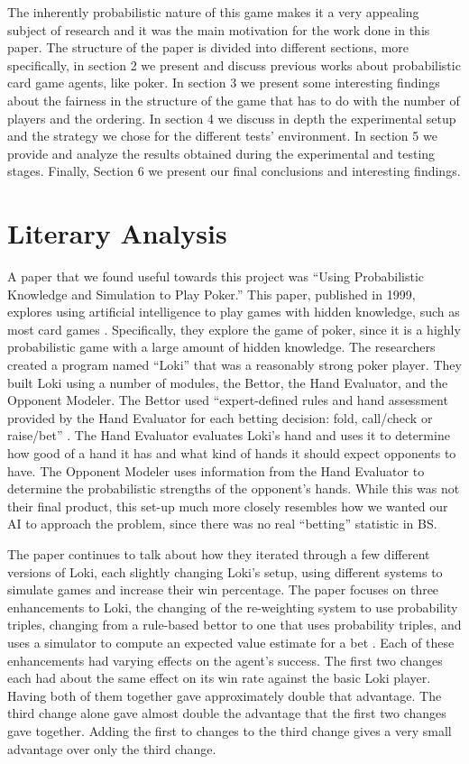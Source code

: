 \documentclass[a4paper,11pt]{article}
\begin{document}
The inherently probabilistic nature of this game makes it a very appealing subject of research and it was the main motivation for the work done in this paper. The structure of the paper is divided into different sections, more specifically,  in section 2 we present and discuss previous works about probabilistic card game agents, like poker. In section 3 we present some interesting findings about the fairness in the structure of the game that has to do with the number of players and the ordering. In section 4 we discuss in depth the experimental setup and the strategy we chose for the different tests’ environment. In section 5 we provide and analyze the results obtained during the experimental and testing stages. Finally, Section 6 we present our final conclusions and interesting findings. 


\section{Literary Analysis}

A paper that we found useful towards this project was “Using Probabilistic Knowledge and Simulation to Play Poker.” This paper, published in 1999, explores using artificial intelligence to play games with hidden knowledge, such as most card games \cite{billings}. Specifically, they explore the game of poker, since it is a highly probabilistic game with a large amount of hidden knowledge. The researchers created a program named “Loki” that was a reasonably strong poker player. They built Loki using a number of modules, the Bettor, the Hand Evaluator, and the Opponent Modeler. The Bettor used “expert-defined rules and hand assessment provided by the Hand Evaluator for each betting decision: fold, call/check or raise/bet” \cite{billings}.  The Hand Evaluator evaluates Loki’s hand and uses it to determine how good of a hand it has and what kind of hands it should expect opponents to have. The Opponent Modeler uses information from the Hand Evaluator to determine the probabilistic strengths of the opponent’s hands. While this was not their final product, this set-up much more closely resembles how we wanted our AI to approach the problem, since there was no real “betting” statistic in BS.

	The paper continues to talk about how they iterated through a few different versions of Loki, each slightly changing Loki’s setup, using different systems to simulate games and increase their win percentage. The paper focuses on three enhancements to Loki, the changing of the re-weighting system to use probability triples, changing from a rule-based bettor to one that uses probability triples, and uses a simulator to compute an expected value estimate for a bet \cite{billings}. Each of these enhancements had varying effects on the agent’s success. The first two changes each had about the same effect on its win rate against the basic Loki player. Having both of them together gave approximately double that advantage. The third change alone gave almost double the advantage that the first two changes gave together. Adding the first to changes to the third change gives a very small advantage over only the third change. 
\end{document}
